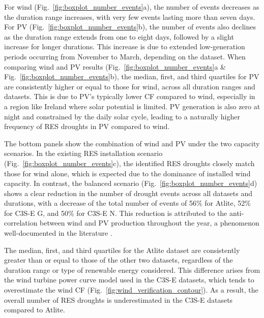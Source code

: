 \documentclass[a4paper, 11pt]{article}
\begin{document}
For wind (Fig.~\ref{fig:boxplot_number_events}a), the number of events decreases as the duration range increases, with very few events lasting more than seven days. For PV (Fig.~\ref{fig:boxplot_number_events}b), the number of events also declines as the duration range extends from one to eight days, followed by a slight increase for longer durations. This increase is due to extended low-generation periods occurring from November to March, depending on the dataset. When comparing wind and PV results (Fig.~\ref{fig:boxplot_number_events}a \& Fig.~\ref{fig:boxplot_number_events}b), the median, first, and third quartiles for PV are consistently higher or equal to those for wind, across all duration ranges and datasets. This is due to PV's typically lower CF compared to wind, especially in a region like Ireland where solar potential is limited. PV generation is also zero at night and constrained by the daily solar cycle, leading to a naturally higher frequency of RES droughts in PV compared to wind.

The bottom panels show the combination of wind and PV under the two capacity scenarios. In the existing RES installation scenario (Fig.~\ref{fig:boxplot_number_events}c), the identified RES droughts closely match those for wind alone, which is expected due to the dominance of installed wind capacity. In contrast, the balanced scenario (Fig.~\ref{fig:boxplot_number_events}d) shows a clear reduction in the number of drought events across all datasets and durations, with a decrease of the total number of events of 56\% for Atlite, 52\% for C3S-E G, and 50\% for C3S-E N. This reduction is attributed to the anti-correlation between wind and PV production throughout the year, a phenomenon well-documented in the literature \cite{kaspar2019drought}.

The median, first, and third quartiles for the Atlite dataset are consistently greater than or equal to those of the other two datasets, regardless of the duration range or type of renewable energy considered. This difference arises from the wind turbine power curve model used in the C3S-E datasets, which tends to overestimate the wind CF (Fig.~\ref{fig:wind_verification_contour}). As a result, the overall number of RES droughts is underestimated in the C3S-E datasets compared to Atlite. 
\end{document}
